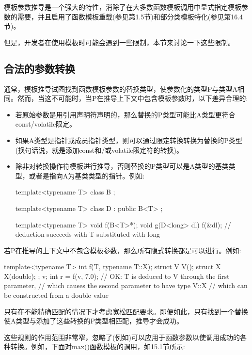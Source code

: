 

模板参数推导是一个强大的特性，消除了在大多数函数模板调用中显式指定模板参数的需要，并且启用了函数模板重载(参见第1.5节)和部分类模板特化(参见第16.4节)。

但是，开发者在使用模板时可能会遇到一些限制，本节来讨论一下这些限制。

\subsection{合法的参数转换}

通常，模板推导试图找到函数模板参数的替换类型，使参数化的类型P与类型A相同。然而，当这不可能时，当P在推导上下文中包含模板参数时，以下差异合理的:

\begin{itemize}
\item 
若原始参数是用引用声明符声明的，那么替换的P类型可能比A类型更符合const/volatile限定。

\item 
如果A类型是指针或成员指针类型，则可以通过限定转换转换为替换的P类型(换句话说，就是添加const和/或volatile限定符的转换)。

\item 
除非对转换操作符模板进行推导，否则替换的P类型可以是A类型的基类类型，或者是指向A为基类类型的指针。例如:

\begin{cpp}
template<typename T>
class B {
};

template<typename T>
class D : public B<T> {
};

template<typename T> void f(B<T>*);
void g(D<long> dl)
{
	f(&dl); // deduction succeeds with T substituted with long
}
\end{cpp}
\end{itemize}

若P在推导的上下文中不包含模板参数，那么所有隐式转换都是可以进行。例如:

\begin{cpp}
template<typename T> int f(T, typename T::X);
struct V {
	V();
	struct X {
		X(double);
	};
} v;
int r = f(v, 7.0); // OK: T is deduced to V through the first parameter,
					// which causes the second parameter to have type V::X
					// which can be constructed from a double value
\end{cpp}

只有在不能精确匹配的情况下才考虑宽松匹配要求。即便如此，只有找到一个替换使A类型与添加了这些转换的P类型相匹配，推导才会成功。

这些规则的作用范围非常窄，忽略了(例如)可以应用于函数参数以使调用成功的各种转换。例如，下面对max()函数模板的调用，如15.1节所示:

